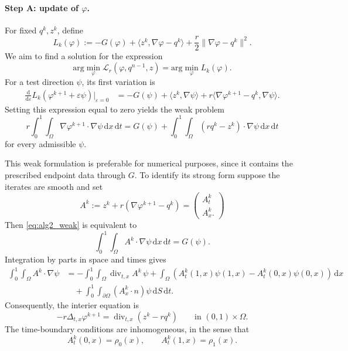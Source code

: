 \paragraph{Step A: update of $\varphi$.}
For fixed $q^k,z^k$, define
$$
L_k(\varphi):= -G(\varphi) + \langle z^k,\nabla\varphi - q^k\rangle + \frac r2\|\nabla\varphi - q^k\|^2.
$$
We aim to find a solution for the expression
$$
\mathrm{arg}\min_\varphi \mathcal{L}_r(\varphi,q^{n-1},z) = \mathrm{arg}\min_\varphi L_k(\varphi).
$$
For a test direction $\psi$, its first variation is
\begin{align*}
	\frac{\mathrm d}{\mathrm d\varepsilon} L_k(\varphi^{k+1}+\varepsilon\psi)\Big|_{\varepsilon = 0} &=-G(\psi) + \langle z^k,\nabla\psi\rangle+r\langle\nabla\varphi^{k+1}-q^k,\nabla\psi\rangle.
\end{align*}
Setting this expression equal to zero yields the weak problem
\begin{equation*}
	\label{eq:alg2_weak}
	r\int_0^1\int_\Omega\nabla\varphi^{k+1}\cdot \nabla\psi\,\mathrm dx\,\mathrm dt = G(\psi) + \int_0^1\int_\Omega(rq^k-z^k)\cdot\nabla\psi\,\mathrm dx\,\mathrm dt
\end{equation*}
for every admissible $\psi$.

This weak formulation is preferable for numerical purposes, since it contains the prescribed endpoint data through $G$. To identify its strong form suppose the iterates are smooth and set 
$$
A^k := z^k+r(\nabla\varphi^{k+1}-q^k) = \begin{pmatrix}
A_t^k\\ A_x^k.
\end{pmatrix}
$$
Then \eqref{eq:alg2_weak} is equivalent to 
$$
\int_0^1\int_\Omega A^k\cdot \nabla\psi\,\mathrm dx\,\mathrm dt = G(\psi).
$$
Integration by parts in space and times gives
\begin{align*}
	\int_0^1\int_\Omega A^k\cdot \nabla\psi &= -\int_0^1\int_\Omega\operatorname{div}_{t,x}A^k\,\psi+\int_\Omega\left(A_t^k(1,x)\psi(1,x)-A_t^k(0,x)\psi(0,x)\right)\,\mathrm dx\\
											&\quad + \int_0^1\int_{\partial\Omega}(A_x^k\cdot n)\psi\,\mathrm dS\,\mathrm dt.
\end{align*}
Consequently, the interier equation is 
\begin{equation*}
	-r\Delta_{t,x}\varphi^{k+1} = \operatorname{div}_{t,x}(z^k-rq^k)\qquad \text{in }(0,1)\times\Omega.
\end{equation*}
The time-boundary conditions are inhomogeneous, in the sense that
\begin{equation*}
	A_t^k(0,x) = \rho_0(x),\qquad A_t^k(1,x) = \rho_1(x).
\end{equation*}

